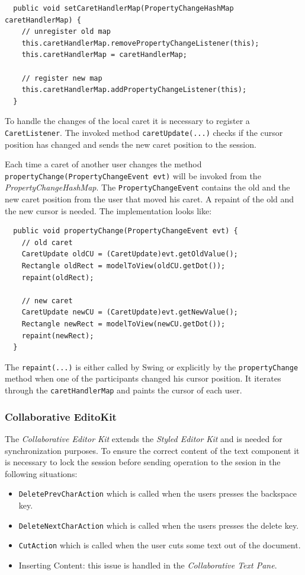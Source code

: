 \begin{verbatim}
  public void setCaretHandlerMap(PropertyChangeHashMap caretHandlerMap) {
    // unregister old map
    this.caretHandlerMap.removePropertyChangeListener(this);
    this.caretHandlerMap = caretHandlerMap;

    // register new map
    this.caretHandlerMap.addPropertyChangeListener(this);
  }
\end{verbatim}

To handle the changes of the local caret it is necessary to register a \texttt{CaretListener}. The invoked method \texttt{caretUpdate(...)} checks if the cursor position has changed and sends the new caret position to the session.

Each time a caret of another user changes the method \texttt{propertyChange(PropertyChangeEvent evt)} will be invoked from the \textit{PropertyChangeHashMap}. The \texttt{PropertyChangeEvent} contains the old and the new caret position from the user that moved his caret. A repaint of the old and the new cursor is needed. The implementation looks like:

\begin{verbatim}
  public void propertyChange(PropertyChangeEvent evt) {
    // old caret
    CaretUpdate oldCU = (CaretUpdate)evt.getOldValue();
    Rectangle oldRect = modelToView(oldCU.getDot());
    repaint(oldRect);

    // new caret
    CaretUpdate newCU = (CaretUpdate)evt.getNewValue();
    Rectangle newRect = modelToView(newCU.getDot());
    repaint(newRect);
  }
\end{verbatim}

The \texttt{repaint(...)} is either called by Swing or explicitly by the \texttt{propertyChange} method when one of the participants changed his cursor position. It iterates through the \texttt{caretHandlerMap} and paints the cursor of each user.

\subsubsection{Collaborative EditoKit}
\label{collaborative_editor_kit}
The \textit{Collaborative Editor Kit} extends the \textit{Styled Editor Kit} and is needed for synchronization purposes. To ensure the correct content of the text component it is necessary to lock the session before sending operation to the sesion in the following situations:

\begin{itemize}
\item \texttt{DeletePrevCharAction} which is called when the users presses the backspace key.
\item \texttt{DeleteNextCharAction} which is called when the users presses the delete key.
\item \texttt{CutAction} which is called when the user cuts some text out of the document.
\item Inserting Content: this issue is handled in the \textit{Collaborative Text Pane}.
\end{itemize}

